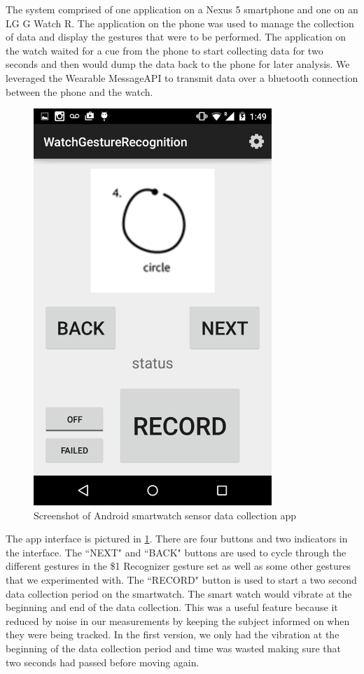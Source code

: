 \documentclass{report}
\begin{document}
The system comprised of one application on a Nexus 5 smartphone and one on an LG G Watch R. The application on the phone was used to manage the collection of data and display the gestures that were to be performed. The application on the watch waited for a cue from the phone to start collecting data for two seconds and then would dump the data back to the phone for later analysis. We leveraged the Wearable MessageAPI to transmit data over a bluetooth connection between the phone and the watch.

\begin{figure}[ht!]
  \label{app}
  \centering
  \includegraphics[width=90mm]{app}
  \caption{Screenshot of Android smartwatch sensor data collection app}
\end{figure}


The app interface is pictured in \ref{app}. There are four buttons and two indicators in the interface. The ``NEXT" and ``BACK" buttons are used to cycle through the different gestures in the \$1 Recognizer gesture set as well as some other gestures that we experimented with. The ``RECORD" button is used to start a two second data collection period on the smartwatch. The smart watch would vibrate at the beginning and end of the data collection. This was a useful feature because it reduced by noise in our measurements by keeping the subject informed on when they were being tracked. In the first version, we only had the vibration at the beginning of the data collection period and time was wasted making sure that two seconds had passed before moving again.
\end{document}
